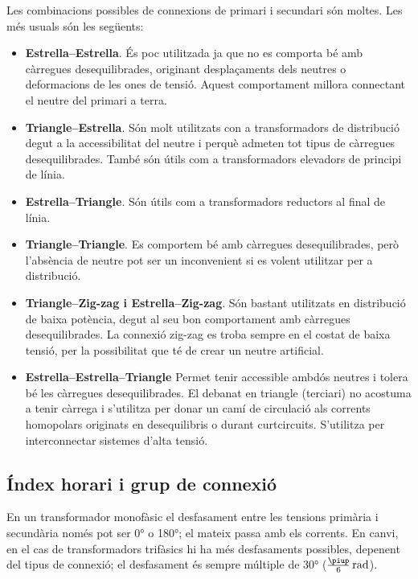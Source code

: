 Les combinacions possibles de connexions de primari i secundari són moltes. Les més usuals són les següents:
\begin{itemize}
   \item \textbf{Estrella--Estrella}. És poc utilitzada ja que no es comporta bé amb càrregues desequilibrades, originant desplaçaments dels neutres o deformacions de les ones de tensió. Aquest comportament millora connectant el neutre del primari a terra.
   \item \textbf{Triangle--Estrella}. Són molt utilitzats con a transformadors de distribució degut a la accessibilitat del neutre i perquè admeten tot tipus de càrregues desequilibrades. També són útils com a transformadors elevadors de principi de línia.
   \item \textbf{Estrella--Triangle}. Són útils com a transformadors reductors al final de línia.
   \item \textbf{Triangle--Triangle}. Es comportem bé amb càrregues desequilibrades, però l'absència de neutre pot ser un inconvenient si es volent utilitzar per a distribució.
   \item \textbf{Triangle--Zig-zag i Estrella--Zig-zag}. Són bastant utilitzats en distribució de baixa potència, degut al seu bon comportament amb càrregues desequilibrades. La connexió zig-zag es troba sempre en el costat de baixa tensió, per la possibilitat que té de crear un neutre artificial.
   \item \textbf{Estrella--Estrella--Triangle} Permet tenir accessible ambdós  neutres i tolera  bé les càrregues  desequilibrades. El debanat en triangle (terciari) no acostuma a tenir càrrega i s'utilitza per donar un camí de circulació als corrents homopolars originats en desequilibris o durant curtcircuits. S'utilitza per interconnectar sistemes d'alta tensió.
\end{itemize}


\subsection{Índex horari i grup de connexió}\label{sec:connex-index-horari}

En un transformador monofàsic el desfasament entre les tensions primària i secundària només pot ser \ang{0} o \ang{180}; el mateix passa amb els corrents. En canvi, en el cas de transformadors trifàsics hi ha més desfasaments possibles, depenent del tipus de connexió; el desfasament és sempre múltiple de \ang{30} ($\frac{\piup}{6}\si{\,rad}$).

